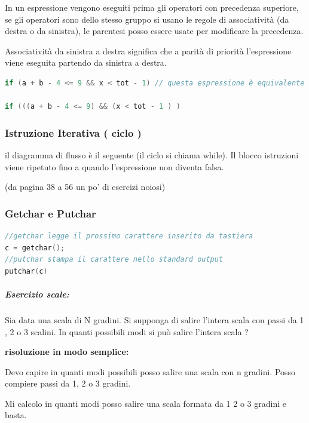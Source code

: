 \documentclass[
  paper=a4,
  oneside  ,captions=tableheading
]{scrbook}
\begin{document}
In un espressione vengono eseguiti prima gli operatori con precedenza
superiore, se gli operatori sono dello stesso gruppo si usano le regole
di associatività (da destra o da sinistra), le parentesi posso essere
usate per modificare la precedenza.

Associatività da sinistra a destra significa che a parità di priorità
l'espressione viene eseguita partendo da sinistra a destra.

\begin{lstlisting}[language={C++}]
if (a + b - 4 <= 9 && x < tot - 1) // questa espressione è equivalente a quella sotto

if (((a + b - 4 <= 9) && (x < tot - 1 ) )
\end{lstlisting}

\hypertarget{istruzione-iterativa-ciclo}{%
\subsubsection{Istruzione Iterativa ( ciclo
)}\label{istruzione-iterativa-ciclo}}

il diagramma di flusso è il seguente (il ciclo si chiama while). Il
blocco istruzioni viene ripetuto fino a quando l'espressione non diventa
falsa.

(da pagina 38 a 56 un po' di esercizi noiosi)

\hypertarget{getchar-e-putchar}{%
\subsubsection{Getchar e Putchar}\label{getchar-e-putchar}}

\begin{lstlisting}[language={C++}]
//getchar legge il prossimo carattere inserito da tastiera
c = getchar();
//putchar stampa il carattere nello standard output
putchar(c)
\end{lstlisting}

\hypertarget{esercizio-scale}{%
\subparagraph{Esercizio scale:}\label{esercizio-scale}}

Sia data una scala di N gradini. Si supponga di salire l'intera scala
con passi da 1 , 2 o 3 scalini. In quanti possibili modi si può salire
l'intera scala ?

\textbf{risoluzione in modo semplice:}

Devo capire in quanti modi possibili posso salire una scala con n
gradini. Posso compiere passi da 1, 2 o 3 gradini.

Mi calcolo in quanti modi posso salire una scala formata da 1 2 o 3
gradini e basta.
\end{document}
